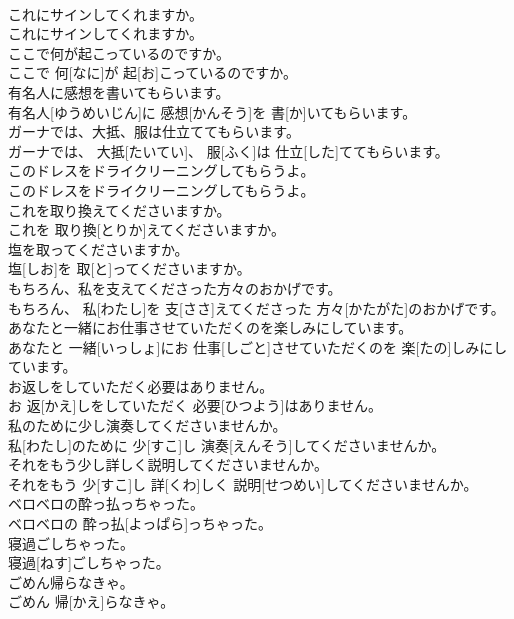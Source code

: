 \documentclass[8pt]{extreport}
\begin{document}
\begin{CJK}{UTF8}{min}
\\	これにサインしてくれますか。	
\\	これにサインしてくれますか。	
\\	ここで何が起こっているのですか。	
\\	ここで 何[なに]が 起[お]こっているのですか。	
\\	有名人に感想を書いてもらいます。	
\\	有名人[ゆうめいじん]に 感想[かんそう]を 書[か]いてもらいます。	
\\	ガーナでは、大抵、服は仕立ててもらいます。	
\\	ガーナでは、 大抵[たいてい]、 服[ふく]は 仕立[した]ててもらいます。	
\\	このドレスをドライクリーニングしてもらうよ。	
\\	このドレスをドライクリーニングしてもらうよ。	
\\	これを取り換えてくださいますか。	
\\	これを 取り換[とりか]えてくださいますか。	
\\	塩を取ってくださいますか。	
\\	塩[しお]を 取[と]ってくださいますか。	
\\	もちろん、私を支えてくださった方々のおかげです。	
\\	もちろん、 私[わたし]を 支[ささ]えてくださった 方々[かたがた]のおかげです。	
\\	あなたと一緒にお仕事させていただくのを楽しみにしています。	
\\	あなたと 一緒[いっしょ]にお 仕事[しごと]させていただくのを 楽[たの]しみにしています。	
\\	お返しをしていただく必要はありません。	
\\	お 返[かえ]しをしていただく 必要[ひつよう]はありません。	
\\	私のために少し演奏してくださいませんか。	
\\	私[わたし]のために 少[すこ]し 演奏[えんそう]してくださいませんか。	
\\	それをもう少し詳しく説明してくださいませんか。	
\\	それをもう 少[すこ]し 詳[くわ]しく 説明[せつめい]してくださいませんか。	
\\	ベロベロの酔っ払っちゃった。	
\\	ベロベロの 酔っ払[よっぱら]っちゃった。	
\\	寝過ごしちゃった。	
\\	寝過[ねす]ごしちゃった。	
\\	ごめん帰らなきゃ。	
\\	ごめん 帰[かえ]らなきゃ。	

\end{CJK}
\end{document}
